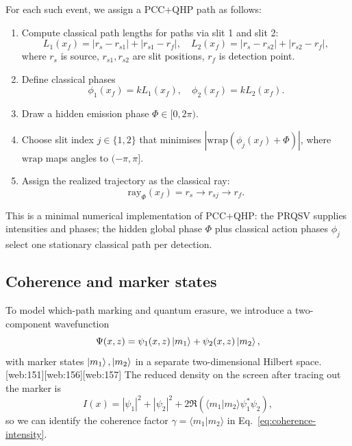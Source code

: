 \documentclass[11pt]{article}
\begin{document}
For each such event, we assign a PCC+QHP path as follows:

\begin{enumerate}[leftmargin=*]
  \item Compute classical path lengths for paths via slit 1 and slit 2:
  \[
  L_1(x_f) = |r_s - r_{s1}| + |r_{s1}-r_f|,\quad
  L_2(x_f) = |r_s - r_{s2}| + |r_{s2}-r_f|,
  \]
  where \(r_s\) is source, \(r_{s1}, r_{s2}\) are slit positions, \(r_f\) is detection point.

  \item Define classical phases
  \[
  \phi_1(x_f) = k L_1(x_f),\quad \phi_2(x_f) = k L_2(x_f).
  \]

  \item Draw a hidden emission phase \(\Phi\in[0,2\pi)\).

  \item Choose slit index \(j\in\{1,2\}\) that minimises \(|\mathrm{wrap}(\phi_j(x_f)+\Phi)|\), where \(\mathrm{wrap}\) maps angles to \((-\pi,\pi]\).

  \item Assign the realized trajectory as the classical ray:
  \[
  \text{ray}_\Phi(x_f) = r_s \to r_{sj} \to r_f.
  \]
\end{enumerate}

This is a minimal numerical implementation of PCC+QHP: the PRQSV supplies intensities and phases; the hidden global phase \(\Phi\) plus classical action phases \(\phi_j\) select one stationary classical path per detection.

\subsection{Coherence and marker states}

To model which-path marking and quantum erasure, we introduce a two-component wavefunction
\begin{equation}
\Psi(x,z) = \psi_1(x,z)\ket{m_1} + \psi_2(x,z)\ket{m_2},
\end{equation}
with marker states \(\ket{m_1},\ket{m_2}\) in a separate two-dimensional Hilbert space.\,[web:151][web:156][web:157]
The reduced density on the screen after tracing out the marker is
\begin{equation}
I(x) = |\psi_1|^2 + |\psi_2|^2 + 2 \Re\left( \langle m_1|m_2\rangle \psi_1^*\psi_2 \right),
\end{equation}
so we can identify the coherence factor
\(\gamma=\langle m_1|m_2\rangle\) in Eq.~\eqref{eq:coherence-intensity}.
\end{document}
